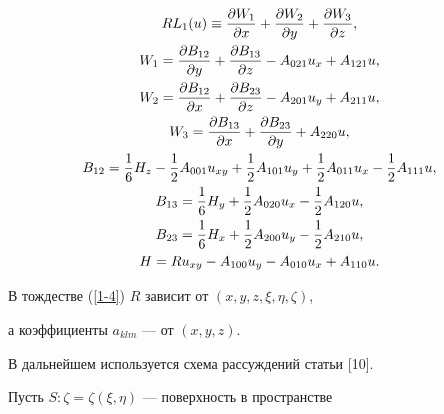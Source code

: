 \begin{gather}\label{1-4}


RL_{1}(u)\equiv \frac{\partial W_1}{\partial x}


+\frac{\partial W_2}{\partial y}+\frac{\partial W_3}{\partial z},\\


%


W_1=\frac{\partial B_{12}}{\partial y}


+\frac{\partial B_{13}}{\partial z}-A_{021}u_{x}+A_{121}u,\notag\\


%


W_2=\frac{\partial B_{12}}{\partial x}


+\frac{\partial B_{23}}{\partial z}-A_{201}u_{y}+A_{211}u,\notag\\


%


W_3=\frac{\partial B_{13}}{\partial x}


+\frac{\partial B_{23}}{\partial y}+A_{220}u,\notag\\


%


B_{12}=\frac{1}{6}H_{z}-\frac{1}{2}A_{001}u_{xy}


+\frac{1}{2}A_{101}u_{y}+\frac{1}{2}A_{011}u_{x}-\frac{1}{2}A_{111}u,\notag\\


%


B_{13}=\frac{1}{6}H_{y}+\frac{1}{2}A_{020}u_{x}-\frac{1}{2}A_{120}u,\notag\\


%


B_{23}=\frac{1}{6}H_{x}+\frac{1}{2}A_{200}u_{y}-\frac{1}{2}A_{210}u,\notag\\


H=Ru_{xy}-A_{100}u_{y}-A_{010}u_{x}+A_{110}u.\notag


\end{gather}


В тождестве (\ref{1-4}) $R$ зависит от $(x,y,z,\xi,\eta,\zeta)$,


а коэффициенты $a_{klm}$ --- от $(x,y,z)$.





В дальнейшем используется схема рассуждений статьи [10].





Пусть $S: \zeta=\zeta(\xi,\eta)$ ---  поверхность в пространстве


